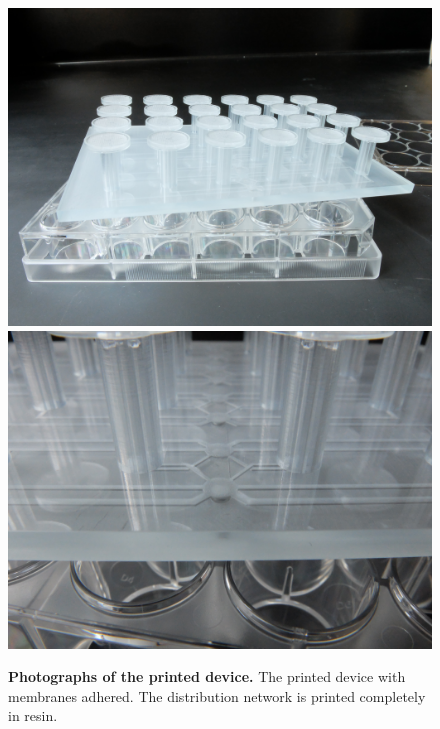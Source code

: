\begin{figure}
\includegraphics[scale=0.05]{../presentation-figures/24well.JPG} %
\includegraphics[scale=0.05]{../presentation-figures/printed-network.JPG} %
\caption{
{\bf Photographs of the printed device.}  The printed device with membranes adhered. The distribution network is printed completely in resin.
}
\label{Figure_label}
\end{figure}

